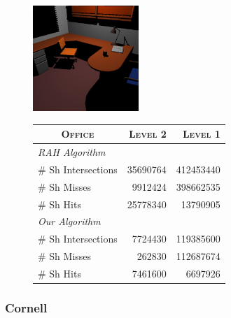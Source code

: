 \begin{figure}[!htb]
    \begin{minipage}{0.25\linewidth}
        \centering
        \includegraphics[width=4.0cm]{Images/Office_Preview}
    \end{minipage}
    \begin{minipage}{0.725\linewidth}
        \centering
        \fontsize{8}{10}
        \selectfont
        \begin{tabular}[h]{l|rr}
            \multicolumn{1}{c|}{\textsc{Office}} & \textsc{Level 2} & \textsc{Level 1}\\
            \hline
            \emph{RAH Algorithm} & & \\
            \hline
            \quad \# Sh Intersections   & 35690764	& 412453440	\\
            \quad \# Sh Misses          & 9912424	& 398662535	\\
            \quad \# Sh Hits            & 25778340  & 13790905	\\
            \hline
            \emph{Our Algorithm} & & \\
            \hline
            \quad \# Sh Intersections  & 7724430    & 119385600	\\
            \quad \# Sh Misses         & 262830	    & 112687674	\\
            \quad \# Sh Hits           & 7461600	& 6697926	\\
        \end{tabular}
        \label{table:office-d16-n2-results}
    \end{minipage}
\end{figure}

\subsubsection{Cornell}


